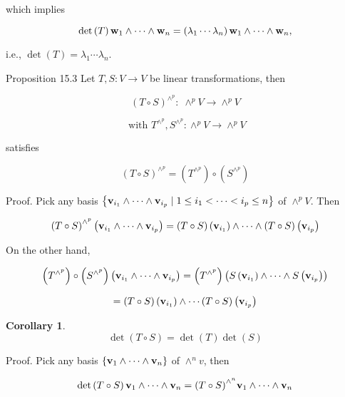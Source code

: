 \documentclass[11pt]{article}
\newtheorem{corollary}[theorem]{Corollary}
\begin{document}
which implies

\[
\det \left( T\right) {\bf w}_1 \land  \cdots  \land  {\bf w}_n = \left( {{\lambda }_1\cdots {\lambda }_n}\right) {\bf w}_1 \land  \cdots  \land  {\bf w}_n,
\]

i.e., \(\det \left( T\right)  = {\lambda }_1\cdots {\lambda }_n\).

Proposition 15.3 Let \(T,S : V \rightarrow  V\) be linear transformations, then

\[
{\left( T \circ  S\right) }^{{ \land  }^{p}} : \;{ \land  }^{p}V \rightarrow  { \land  }^{p}V
\]

\[
\text{ with }{T}^{{ \land  }^{p}},{S}^{{ \land  }^{p}} : { \land  }^{p}V \rightarrow  { \land  }^{p}V
\]

satisfies

\[
{\left( T \circ  S\right) }^{{ \land  }^{p}} = \left( {T}^{{ \land  }^{p}}\right)  \circ  \left( {S}^{{ \land  }^{p}}\right)
\]

Proof. Pick any basis \(\left\{  {{\bf v}_{{i}_1} \land  \cdots  \land  {\bf v}_{{i}_{p}} \mid  1 \leq  {i}_1 < \cdots  < {i}_{p} \leq  n}\right\}\) of \({ \land  }^{p}V\). Then

\[
{\left( T \circ  S\right) }^{{ \land  }^{p}}\left( {{\bf v}_{{i}_1} \land  \cdots  \land  {\bf v}_{{i}_{p}}}\right)  = \left( {T \circ  S}\right) \left( {\bf v}_{{i}_1}\right)  \land  \cdots  \land  \left( {T \circ  S}\right) \left( {\bf v}_{{i}_{p}}\right)
\]

On the other hand,

\[
\left( {T}^{{ \land  }^{p}}\right)  \circ  \left( {S}^{{ \land  }^{p}}\right) \left( {{\bf v}_{{i}_1} \land  \cdots  \land  {\bf v}_{{i}_{p}}}\right)  = \left( {T}^{{ \land  }^{p}}\right) \left( {S\left( {\bf v}_{{i}_1}\right)  \land  \cdots  \land  S\left( {\bf v}_{{i}_{p}}\right) }\right)
\]

\[
= \left( {T \circ  S}\right) \left( {\bf v}_{{i}_1}\right)  \land  \cdots \left( {T \circ  S}\right) \left( {\bf v}_{{i}_{p}}\right)
\]

\begin{corollary}
\[
\det \left( {T \circ  S}\right)  = \det \left( T\right) \det \left( S\right)
\]
\end{corollary}

Proof. Pick any basis \(\left\{  {{\bf v}_1 \land  \cdots  \land  {\bf v}_n}\right\}\) of \({ \land  }^nv\), then

\[
\det \left( {T \circ  S}\right) {\bf v}_1 \land  \cdots  \land  {\bf v}_n = {\left( T \circ  S\right) }^{{ \land  }^n}{\bf v}_1 \land  \cdots  \land  {\bf v}_n
\]
\end{document}
